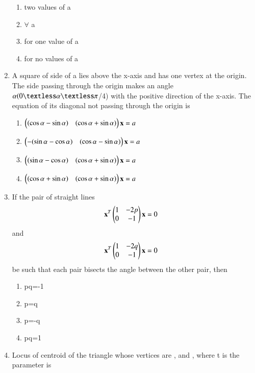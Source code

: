 \begin{enumerate}
    \begin{enumerate}
     \item  two values of a 
     \item  $\forall$ a
     \item  for one value of a 
     \item  for no values of a 
     \end{enumerate}
    \item A square of side of a lies above the x-axis and has one vertex at the origin. The side passing through the origin makes an angle $\alpha(0\textless\alpha\textless\pi$/4) with the positive direction of the x-axis. The equation of its diagonal not passing through the origin is
    \begin{enumerate}
     \item  $\begin{pmatrix}(\cos\alpha-\sin\alpha) & (\cos\alpha+\sin\alpha)\end{pmatrix}\mathbf {x} = a$
     \item  $\begin{pmatrix}-(\sin\alpha-\cos\alpha) & (\cos\alpha-\sin\alpha)\end{pmatrix}\mathbf {x} =a$
     \item  $\begin{pmatrix}(\sin\alpha-\cos\alpha)& (\cos\alpha+\sin\alpha)\end{pmatrix}\mathbf {x}  =a$
     \item  $\begin{pmatrix}(\cos\alpha+\sin\alpha) & (\cos\alpha+\sin\alpha)\end{pmatrix} \mathbf {x}  =a$\\
     \end{enumerate}
    \item If the pair of straight lines \begin{align}\mathbf{x}^T \begin{pmatrix}1 & -2p \\ 0 & -1\end{pmatrix}\mathbf {x} &= 0\end{align} and \begin{align}\mathbf{x}^T \begin{pmatrix}1 & -2q \\ 0 & -1\end{pmatrix}\mathbf {x} &= 0\end{align} be such that each pair bisects the angle between the other pair, then
    \begin{enumerate}
     \item  pq=-1
     \item  p=q
     \item  p=-q
     \item  pq=1
     \end{enumerate}
    \item Locus of centroid of the triangle whose vertices are  , and , where t is the parameter is

\end{enumerate}
